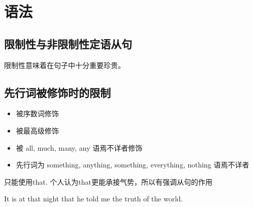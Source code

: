 \documentclass[utf8]{ctexart}
\begin{document}
		\section{语法}
		\subsection{限制性与非限制性定语从句}
		\Large 限制性意味着在句子中十分重要珍贵。
		\subsection{先行词被修饰时的限制}
		\begin{itemize}
				\item 被序数词修饰
				\item 被最高级修饰
				\item 被 all, much, many, any 语焉不详者修饰
				\item 先行词为 something, anything, something, everything, nothing 语焉不详者			
		\end{itemize}
		\Large 只能使用that. 个人认为that更能承接气势，所以有强调从句的作用
        \par It is at that night that he told me the truth of the world.
		
		
		
		
\end{document}
